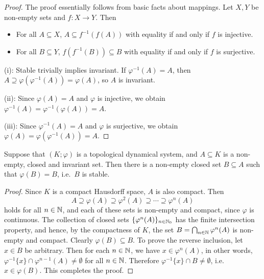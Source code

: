 \begin{proof}
	The proof essentially follows from basic facts about mappings. Let $X, Y$ be non-empty sets and $f:X \to Y$. Then
	\begin{itemize}
		\item For all $A \subseteq X$, $A \subseteq f^{-1}(f(A))$ with equality if and only if $f$ is injective.
		\item For all $B \subseteq Y$, $f(f^{-1}(B)) \subseteq B$ with equality if and only if $f$ is surjective.
	\end{itemize}
	
	(i): Stable trivially implies invariant. If $\varphi^{-1}(A) = A$, then $A \supseteq \varphi(\varphi^{-1}(A)) = \varphi(A)$, so $A$ is invariant.
	
	(ii): Since $\varphi(A)=A$ and $\varphi$ is injective, we obtain $\varphi^{-1}(A) = \varphi^{-1}(\varphi(A)) = A$.
	
	(iii): Since $\varphi^{-1}(A)=A$ and $\varphi$ is surjective, we obtain $\varphi(A) = \varphi(\varphi^{-1}(A)) = A$.
\end{proof}

\begin{lemma}
	Suppose that $(K;\varphi)$ is a topological dynamical system, and $A \subseteq K$ is a non-empty, closed and invariant set. Then there is a non-empty closed set $B \subseteq A$ such that $\varphi(B)=B$, i.e.\ $B$ is stable.
\end{lemma}

\begin{proof}
	Since $K$ is a compact Hausdorff space, $A$ is also compact. Then
	\begin{equation*}
		A \supseteq \varphi(A) \supseteq \varphi^2(A) \supseteq \cdots \supseteq \varphi^n(A)
	\end{equation*}
	holds for all $n\in\mathbb{N}$, and each of these sets is non-empty and compact, since $\varphi$ is continuous. The collection of closed sets $\{\varphi^n(A)\}_{n\in\mathbb{N}_0}$ has the finite intersection property, and hence, by the compactness of $K$, the set $B = \bigcap_{n\in\mathbb{N}} \varphi^n(A)$ is non-empty and compact. Clearly $\varphi(B) \subseteq B$. To prove the reverse inclusion, let $x\in B$ be arbitrary. Then for each $n\in\mathbb{N}$, we have $x \in \varphi^n(A)$, in other words, $\varphi^{-1}\{x\} \cap \varphi^{n-1}(A) \ne \emptyset$ for all $n\in\mathbb{N}$. Therefore $\varphi^{-1}\{x\} \cap B \ne \emptyset$, i.e.\ $x\in \varphi(B)$. This completes the proof. 
\end{proof}

